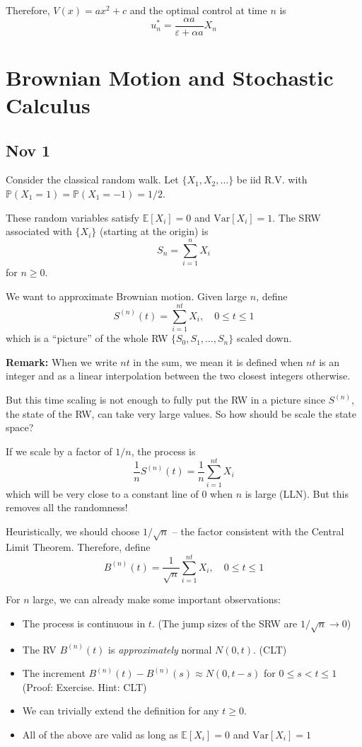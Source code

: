 \documentclass[12pt]{report}
\renewcommand{\P}{\mathbb{P}}
\newcommand{\E}{\mathbb{E}}
\newcommand{\ep}{\varepsilon}
\newcommand{\Var}{\text{Var}}
\newcommand*{\tbf}[1]{\ifmmode\mathbf{#1}\else\textbf{#1}\fi}
\begin{document}
    Therefore, $V(x) = ax^2 + c$ and the optimal control at time $n$ is 
    \[u_n^* = \frac{\alpha a}{\ep + \alpha a} X_n\]



\chapter{Brownian Motion and Stochastic Calculus}
\section{Nov 1}
    Consider the classical random walk. Let $\{X_1, X_2, \dots\}$ be iid R.V. with $\P(X_1 = 1) = \P(X_1 = -1) = 1/2$.

    These random variables satisfy $\E[X_i] = 0$ and $\Var[X_i] = 1$. The SRW associated with $\{X_i\}$ (starting at the origin) is 
    \[S_n = \sum_{i=1}^n X_i\]
    for $n\geq 0$.

    We want to approximate Brownian motion. Given large $n$, define 
    \[S^(n)(t) = \sum_{i=1}^{nt} X_i, \quad 0 \leq t \leq 1\] 
    which is a ``picture'' of the whole RW $\{S_0, S_1, \dots, S_n\}$ scaled down. 

    \tbf{Remark:} When we write $nt$ in the sum, we mean it is defined when $nt$ is an integer and as a linear interpolation between the two closest integers otherwise.

    But this time scaling is not enough to fully put the RW in a picture since $S^{(n)}$, the state of the RW, can take very large values. So how should be scale the state space?

    If we scale by a factor of $1/n$, the process is 
    \[\frac{1}{n} S^{(n)}(t) = \frac{1}{n}\sum_{i=1}^{nt} X_i\]
    which will be very close to a constant line of $0$ when $n$ is large (LLN). But this removes all the randomness! 

    Heuristically, we should choose $1/\sqrt{n}$ -- the factor consistent with the Central Limit Theorem. Therefore, define
    \[B^{(n)}(t) = \frac{1}{\sqrt n} \sum_{i=1}^{nt} X_i, \quad 0 \leq t \leq 1\]

    For $n$ large, we can already make some important observations:
    \begin{itemize}
        \item The process is continuous in $t$. (The jump sizes of the SRW are $1/\sqrt n \to 0$)
        \item The RV $B^{(n)}(t)$ is \emph{approximately} normal $N(0, t)$. (CLT)
        \item The increment $B^{(n)}(t) - B^{(n)}(s) \approx N(0, t - s)$ for $0 \leq s < t \leq 1$ (Proof: Exercise. Hint: CLT)
        \item We can trivially extend the definition for any $t \geq 0$. 
        \item All of the above are valid as long as $\E[X_i] = 0$ and $\Var[X_i] = 1$ 
    \end{itemize}
\end{document}
